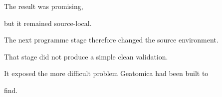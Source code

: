 \documentclass[11pt,a4paper,oneside]{report}
\begin{document}
The result was promising,

but it remained source-local.



The next programme stage therefore changed the source environment.



That stage did not produce a simple clean validation.



It exposed the more difficult problem Geatomica had been built to

find.







%


%



%



%






%



%



%








\end{document}
